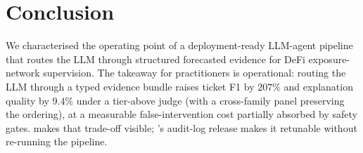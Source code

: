 \section{Conclusion}
\label{sec:conclusion}

We characterised the operating point of a deployment-ready
LLM-agent pipeline that routes the LLM through structured
forecasted evidence for DeFi exposure-network supervision. The
takeaway for practitioners is operational: routing the LLM
through a typed evidence bundle raises ticket F1 by $207\%$ and
explanation quality by $9.4\%$ under a tier-above judge (with a
cross-family panel preserving the ordering), at a measurable
false-intervention cost partially absorbed by safety gates.
\benchname{} makes that trade-off visible; \sysname{}'s
audit-log release makes it retunable without re-running the
pipeline.
